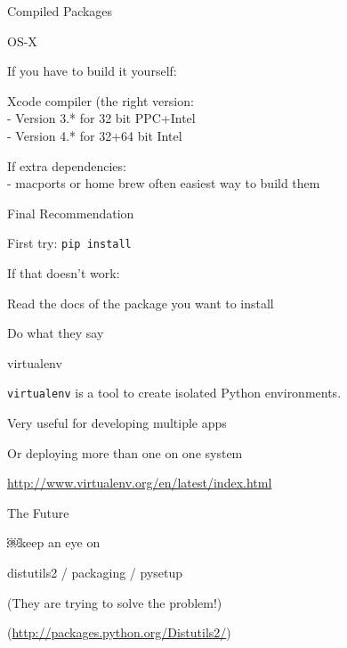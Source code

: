 \documentclass{beamer}
\begin{document}
\begin{frame}[fragile]{Compiled Packages}

{\LARGE OS-X}

\vfill
{\Large If you have to build it yourself:}

\vfill
{\Large Xcode compiler (the right version:\\[0.1in]
  - Version 3.* for 32 bit PPC+Intel\\[0.1in]
  - Version 4.* for 32+64 bit Intel\\
}

\vfill
{\Large If extra dependencies:\\[0.1in]
  - macports or home brew often easiest way to build them
}

\end{frame} 

\begin{frame}[fragile]{Final Recommendation}

{\Large First try: \verb|pip install|}

\vfill
{\Large If that doesn't work:}

\vfill
{\Large Read the docs of the package you want to install}

\vfill
{\Large Do what they say}

\end{frame} 

\begin{frame}[fragile]{virtualenv}

{\Large \verb|virtualenv| is a tool to create isolated Python environments.}

\vfill
{\Large Very useful for developing multiple apps}

\vfill
{\Large Or deploying more than one on one system}

\vfill
\url{http://www.virtualenv.org/en/latest/index.html}
\end{frame} 

\begin{frame}[fragile]{The Future}

{\Large ￼keep an eye on}

\vfill
{\Large distutils2 / packaging / pysetup }

\vfill
{\large (They are trying to solve the problem!) }

\vfill
(\url{http://packages.python.org/Distutils2/})
\end{frame} 
\end{document}
